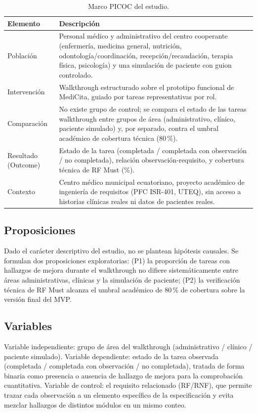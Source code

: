 \documentclass[runningheads]{llncs}
\begin{document}
	\begin{table}[H]
		\centering
		\caption{Marco PICOC del estudio.}
		\label{tab:picoc}
		\begin{tabular}{p{2.3cm}p{9cm}}
			\toprule
			\textbf{Elemento} & \textbf{Descripción}\\
			\midrule
			Población & Personal médico y administrativo del centro cooperante (enfermería, medicina general, nutrición, odontología/coordinación, recepción/recaudación, terapia física, psicología) y una simulación de paciente con guion controlado.\\
			Intervención & Walkthrough estructurado sobre el prototipo funcional de MediCita, guiado por tareas representativas por rol.\\
			Comparación & No existe grupo de control; se compara el estado de las tareas walkthrough entre grupos de área (administrativo, clínico, paciente simulado) y, por separado, contra el umbral académico de cobertura técnica (80\,\%).\\
			Resultado (Outcome) & Estado de la tarea (completada / completada con observación / no completada), relación observación-requisito, y cobertura técnica de RF Must (\%).\\
			Contexto & Centro médico municipal ecuatoriano, proyecto académico de ingeniería de requisitos (PFC ISR-401, UTEQ), sin acceso a historias clínicas reales ni datos de pacientes reales.\\
			\bottomrule
		\end{tabular}
	\end{table}
	
	\subsection{Proposiciones}
	Dado el carácter descriptivo del estudio, no se plantean hipótesis causales. Se formulan dos proposiciones exploratorias: (P1) la proporción de tareas con hallazgos de mejora durante el walkthrough no difiere sistemáticamente entre áreas administrativas, clínicas y la simulación de paciente; (P2) la verificación técnica de RF Must alcanza el umbral académico de 80\,\% de cobertura sobre la versión final del MVP.
	
	\subsection{Variables}
	Variable independiente: grupo de área del walkthrough (administrativo / clínico / paciente simulado). Variable dependiente: estado de la tarea observada (completada / completada con observación / no completada), tratada de forma binaria como presencia o ausencia de hallazgo de mejora para la comprobación cuantitativa. Variable de control: el requisito relacionado (RF/RNF), que permite trazar cada observación a un elemento específico de la especificación y evita mezclar hallazgos de distintos módulos en un mismo conteo.
	
\end{document}
